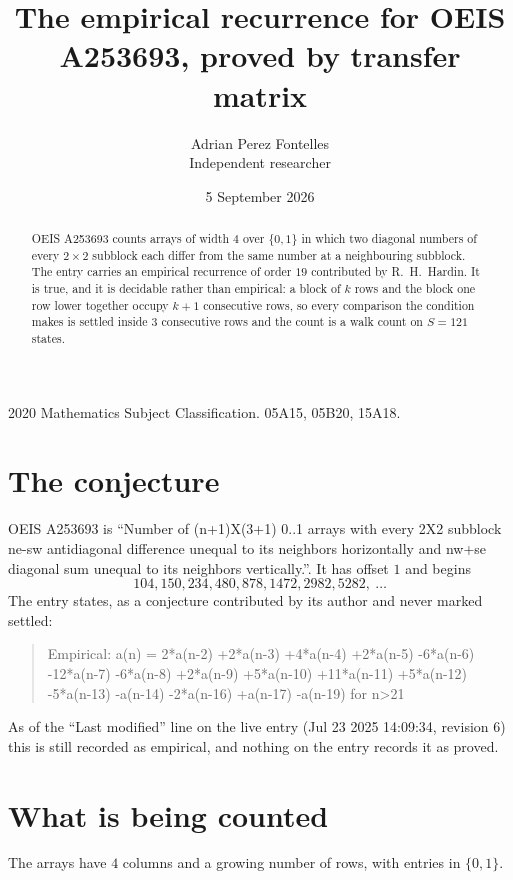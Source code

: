\documentclass[11pt,a4paper]{article}
\title{The empirical recurrence for OEIS A253693, proved by transfer matrix}
\author{Adrian Perez Fontelles\\ \small Independent researcher}
\date{5 September 2026}
\theoremstyle{plain}
\theoremstyle{definition}
\begin{document}
\maketitle

\begin{abstract}
OEIS A253693 counts arrays of width $4$ over $\{0,1\}$ in which two diagonal numbers of every $2\times2$ subblock each differ from the same number at a neighbouring subblock. The entry carries an
empirical recurrence of order $19$ contributed by R.~H.~Hardin. It is true, and it is
decidable rather than empirical: a block of $k$ rows and the block one row lower together
occupy $k+1$ consecutive rows, so every comparison the condition makes is settled inside
$3$ consecutive rows and the count is a walk count on $S=121$ states.
\end{abstract}

\noindent\small 2020 Mathematics Subject Classification. 05A15, 05B20, 15A18.\normalsize

\section{The conjecture}

OEIS A253693 is ``Number of (n+1)X(3+1) 0..1 arrays with every 2X2 subblock ne-sw antidiagonal difference unequal to its neighbors horizontally and nw+se diagonal sum unequal to its neighbors vertically.''. It has offset $1$ and begins
\[
104, 150, 234, 480, 878, 1472, 2982, 5282,\ \dots
\]
The entry states, as a conjecture contributed by its author and never marked settled:
\begin{quote}
Empirical: a(n) = 2*a(n-2) +2*a(n-3) +4*a(n-4) +2*a(n-5) -6*a(n-6) -12*a(n-7) -6*a(n-8) +2*a(n-9) +5*a(n-10) +11*a(n-11) +5*a(n-12) -5*a(n-13) -a(n-14) -2*a(n-16) +a(n-17) -a(n-19) for n>21
\end{quote}
As of the ``Last modified'' line on the live entry (Jul 23 2025 14:09:34, revision 6) this is still
recorded as empirical, and nothing on the entry records it as proved.

\section{What is being counted}

The arrays have $4$ columns and a growing number of rows, with entries in $\{0,1\}$.
\end{document}
